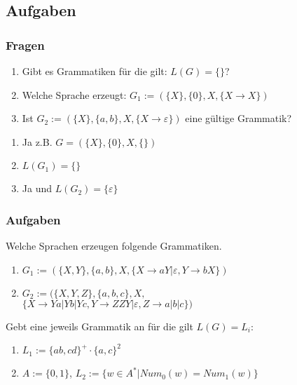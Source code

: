 \subsection{Aufgaben}
\begin{frame}
  \frametitle{Fragen}
  \begin{exampleblock}{}
    \begin{enumerate}
      \item Gibt es Grammatiken für die gilt: $L(G) = \{\}$?
      \item Welche Sprache erzeugt: $G_1 := (\{X\}, \{0\}, X, \{X \longrightarrow X\})$
      \item Ist $G_2 := (\{X\}, \{a, b\}, X, \{X \longrightarrow \varepsilon\})$ eine gültige Grammatik?
    \end{enumerate}
  \end{exampleblock}
  \begin{exampleblock}{}
    \begin{enumerate}
      \pause
      \item Ja z.B. $G = (\{X\}, \{0\}, X, \{\})$
      \pause
      \item $L(G_1) = \{\}$
      \pause
      \item Ja und $L(G_2) = \{\varepsilon\}$
    \end{enumerate}
  \end{exampleblock}
\end{frame}
\begin{frame}
  \frametitle{Aufgaben}
  \begin{exampleblock}{Welche Sprachen erzeugen folgende Grammatiken.}
    \begin{enumerate}
      \item $G_1 := (\{X, Y\}, \{a, b\}, X, \{X \longrightarrow aY | \varepsilon, Y \longrightarrow bX\})$
      \item $G_2 := (\{X, Y, Z\}, \{a, b, c\}, X,$\\
             $\{X \longrightarrow Ya | Yb | Yc, Y \longrightarrow ZZY | \varepsilon, Z \longrightarrow a | b | c\})$
    \end{enumerate}
  \end{exampleblock}
  \begin{exampleblock}{Gebt eine jeweils Grammatik an für die gilt $L(G) = L_i$:}
        \begin{enumerate}
      \item $L_1 := \{ab, cd\}^+ \cdot \{a, c\}^2$
      \item $A := \{0, 1\}$, $L_2 := \{w  \in A^*| Num_0(w) = Num_1(w)\}$
    \end{enumerate}
  \end{exampleblock}
\end{frame}
